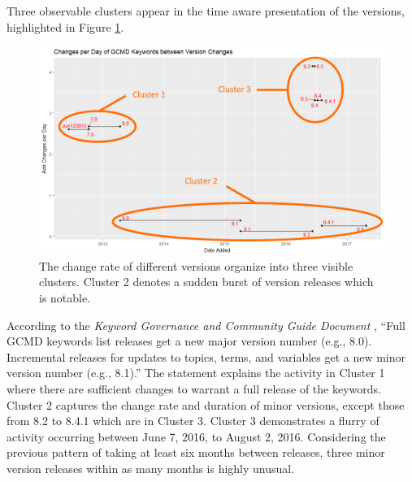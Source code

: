 Three observable clusters appear in the time aware presentation of the versions, highlighted in Figure \ref{GCMDPlot1Cluster}.
\begin{figure}%
	\centering
	\includegraphics[scale=0.56]{figures/GCMDPlot1_Cluster.png}
	\caption[Global Change Master Directory count distributed over time with clusters marked.]{The change rate of different versions organize into three visible clusters. Cluster 2 denotes a sudden burst of version releases which is notable.}
	\label{GCMDPlot1Cluster}
\end{figure}
According to the \textit{Keyword Governance and Community Guide Document} \cite{gcmd_gov}, ``Full GCMD keywords list releases get a new major version number (e.g., 8.0). Incremental releases for updates to topics, terms, and variables get a new minor version number (e.g., 8.1).”
The statement explains the activity in Cluster 1 where there are sufficient changes to warrant a full release of the keywords.
Cluster 2 captures the change rate and duration of minor versions, except those from 8.2 to 8.4.1 which are in Cluster 3.
Cluster 3 demonstrates a flurry of activity occurring between June 7, 2016, to August 2, 2016.
Considering the previous pattern of taking at least six months between releases, three minor version releases within as many months is highly unusual.

